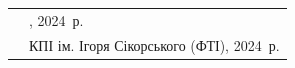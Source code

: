 {\begin{alwayssingle}
		\vfill


		\begin{flushleft}
			\begin{tabular}{p{\textwidth - 45ex}l}
				& \small\textcopyright\quad \authors, 2024~р. \\
				& \small \textcopyright\quad КПІ ім. Ігоря Сікорського (ФТІ), 2024~р.
			\end{tabular}
		\end{flushleft}
		\newpage%
	\end{alwayssingle}
}

